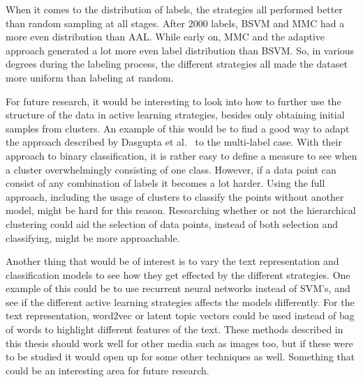When it comes to the distribution of labels, the strategies all performed better than random sampling at all stages.
After 2000 labels, BSVM and MMC had a more even distribution than AAL.
While early on, MMC and the adaptive approach generated a lot more even label distribution than BSVM.
So, in various degrees during the labeling process, the different strategies all made the dataset more uniform than labeling at random.

For future research, it would be interesting to look into how to further use the structure of the data in active learning strategies, besides only obtaining initial samples from clusters.
An example of this would be to find a good way to adapt the approach described by Dasgupta et al\@.~\cite{dasgupta2008hierarchical} to the multi-label case.
With their approach to binary classification, it is rather easy to define a measure to see when a cluster overwhelmingly consisting of one class.
However, if a data point can consist of any combination of labels it becomes a lot harder.
Using the full approach, including the usage of clusters to classify the points without another model, might be hard for this reason.
Researching whether or not the hierarchical clustering could aid the selection of data points, instead of both selection and classifying, might be more approachable.

Another thing that would be of interest is to vary the text representation and classification models to see how they get effected by the different strategies.
One example of this could be to use recurrent neural networks instead of SVM's, and see if the different active learning strategies affects the models differently.
For the text representation, word2vec or latent topic vectors could be used instead of bag of words to highlight different features of the text.
These methods described in this thesis should work well for other media such as images too, but if these were to be studied it would open up for some other techniques as well.
Something that could be an interesting area for future research.
